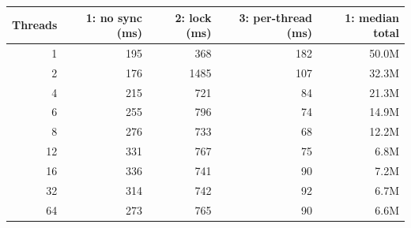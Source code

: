 \begin{tabular}{rrrrr}
\toprule
Threads & 1: no sync (ms) & 2: lock (ms) & 3: per-thread (ms) & 1: median total \\
\midrule
1 & 195 & 368 & 182 & 50.0M \\
2 & 176 & 1485 & 107 & 32.3M \\
4 & 215 & 721 & 84 & 21.3M \\
6 & 255 & 796 & 74 & 14.9M \\
8 & 276 & 733 & 68 & 12.2M \\
12 & 331 & 767 & 75 & 6.8M \\
16 & 336 & 741 & 90 & 7.2M \\
32 & 314 & 742 & 92 & 6.7M \\
64 & 273 & 765 & 90 & 6.6M \\
\bottomrule
\end{tabular}

